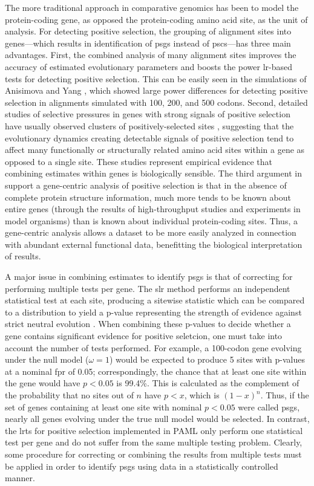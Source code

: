 The more traditional approach in comparative genomics has been to
model the protein-coding gene, as opposed the protein-coding amino
acid site, as the unit of analysis. For detecting positive selection,
the grouping of alignment sites into genes---which results in
identification of \acp{psg} instead of \acp{psc}---has three main
advantages. First, the combined analysis of many alignment sites
improves the accuracy of estimated evolutionary parameters and boosts
the power \ac{lr}-based tests for detecting positive selection. This
can be easily seen in the simulations of Anisimova and Yang
\citeyearpar{Anisimova2001,Anisimova2001}, which showed large power
differences for detecting positive selection in alignments simulated
with 100, 200, and 500 codons. Second, detailed studies of \sw
selective pressures in genes with strong signals of positive selection
have usually observed clusters of positively-selected sites
\citep{Sawyer2005a,Kosiol2008}, suggesting that the evolutionary
dynamics creating detectable signals of positive selection tend to
affect many functionally or structurally related amino acid sites
within a gene as opposed to a single site. These studies represent
empirical evidence that combining \sw estimates within genes is
biologically sensible. The third argument in support a gene-centric
analysis of positive selection is that in the absence of complete
protein structure information, much more tends to be known about
entire genes (through the results of high-throughput studies and
experiments in model organisms) than is known about individual
protein-coding sites. Thus, a gene-centric analysis allows a dataset
to be more easily analyzed in connection with abundant external
functional data, benefitting the biological interpretation of results.

A major issue in combining \sw estimates to identify \acp{psg} is that
of correcting for performing multiple \sw tests per gene. The \ac{slr}
method performs an independent statistical test at each site,
producing a sitewise statistic which can be compared to a \chisq
distribution to yield a p-value representing the strength of evidence
against strict neutral evolution \citep{Massingham2005}. When
combining these p-values to decide whether a gene contains significant
evidence for positive seletcion, one must take into account the number
of tests performed. For example, a 100-codon gene evolving under the
null model ($\omega=1$) would be expected to produce 5 sites with
p-values at a nominal \ac{fpr} of 0.05; correspondingly, the chance
that at least one site within the gene would have $p<0.05$ is
99.4\%. This is calculated as the complement of the probability that
no sites out of $n$ have $p<x$, which is $(1-x)^{n}$. Thus, if the set
of genes containing at least one site with nominal $p<0.05$ were
called \acp{psg}, nearly all genes evolving under the true null model
would be selected. In contrast, the \ac{lrt}s for positive selection
implemented in PAML only perform one statistical test per gene and do
not suffer from the same multiple testing problem. Clearly, some
procedure for correcting or combining the results from multiple tests
must be applied in order to identify \acp{psg} using \sw data in a
statistically controlled manner.


